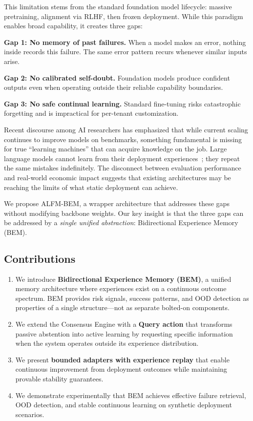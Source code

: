 \documentclass[twoside,11pt]{article}
\begin{document}
This limitation stems from the standard foundation model lifecycle: massive pretraining, alignment via RLHF, then frozen deployment. While this paradigm enables broad capability, it creates three gaps:

\textbf{Gap 1: No memory of past failures.} When a model makes an error, nothing inside records this failure. The same error pattern recurs whenever similar inputs arise.

\textbf{Gap 2: No calibrated self-doubt.} Foundation models produce confident outputs even when operating outside their reliable capability boundaries.

\textbf{Gap 3: No safe continual learning.} Standard fine-tuning risks catastrophic forgetting and is impractical for per-tenant customization.

Recent discourse among AI researchers has emphasized that while current scaling continues to improve models on benchmarks, something fundamental is missing for true ``learning machines'' that can acquire knowledge on the job. Large language models cannot learn from their deployment experiences~\cite{Brown2020,Touvron2023}; they repeat the same mistakes indefinitely. The disconnect between evaluation performance and real-world economic impact suggests that existing architectures may be reaching the limits of what static deployment can achieve.

We propose ALFM-BEM, a wrapper architecture that addresses these gaps without modifying backbone weights. Our key insight is that the three gaps can be addressed by a \emph{single unified abstraction}: Bidirectional Experience Memory (BEM).

\subsection{Contributions}

\begin{enumerate}
    \item We introduce \textbf{Bidirectional Experience Memory (BEM)}, a unified memory architecture where experiences exist on a continuous outcome spectrum. BEM provides risk signals, success patterns, and OOD detection as properties of a single structure---not as separate bolted-on components.
    
    \item We extend the Consensus Engine with a \textbf{Query action} that transforms passive abstention into active learning by requesting specific information when the system operates outside its experience distribution.
    
    \item We present \textbf{bounded adapters with experience replay} that enable continuous improvement from deployment outcomes while maintaining provable stability guarantees.
    
    \item We demonstrate experimentally that BEM achieves effective failure retrieval, OOD detection, and stable continuous learning on synthetic deployment scenarios.
\end{enumerate}
\end{document}
